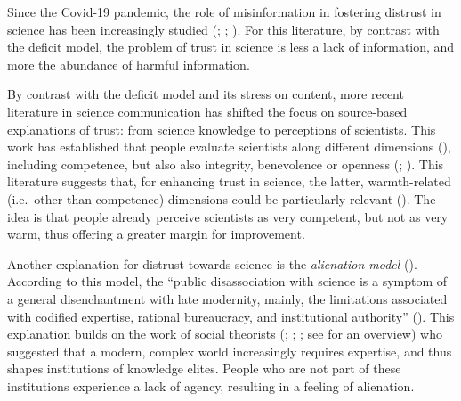 \documentclass[
  jou,
  floatsintext,
  longtable,
  nolmodern,
  notxfonts,
  notimes,
  colorlinks=true,linkcolor=blue,citecolor=blue,urlcolor=blue]{apa7}
\begin{document}
Since the Covid-19 pandemic, the role of misinformation in fostering
distrust in science has been increasingly studied
(;
;
). For this literature, by contrast with the deficit model,
the problem of trust in science is less a lack of information, and more
the abundance of harmful information.

By contrast with the deficit model and its stress on content, more
recent literature in science communication has shifted the focus on
source-based explanations of trust: from science knowledge to
perceptions of scientists. This work has established that people
evaluate scientists along different dimensions
(),
including competence, but also also integrity, benevolence or openness
(; ). This literature suggests that, for enhancing trust in
science, the latter, warmth-related (i.e.~other than competence)
dimensions could be particularly relevant
(). The
idea is that people already perceive scientists as very competent, but
not as very warm, thus offering a greater margin for improvement.

Another explanation for distrust towards science is the \emph{alienation
model} (). According to this model, the ``public disassociation with
science is a symptom of a general disenchantment with late modernity,
mainly, the limitations associated with codified expertise, rational
bureaucracy, and institutional authority''
(). This explanation builds on the work of social theorists
(;
;
; see
 for an
overview) who suggested that a modern, complex world increasingly
requires expertise, and thus shapes institutions of knowledge elites.
People who are not part of these institutions experience a lack of
agency, resulting in a feeling of alienation.
\end{document}
